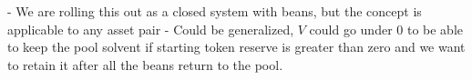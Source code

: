 \documentclass[11pt,a4paper]{article}
\theoremstyle{definition}
\begin{document}
- We are rolling this out as a closed system with beans, but the concept is applicable to any asset pair
- Could be generalized, $V$ could go under 0 to be able to keep the pool solvent if starting token reserve is greater than zero and we want to retain it after all the beans return to the pool.


\newpage
\printbibliography

\end{document}
